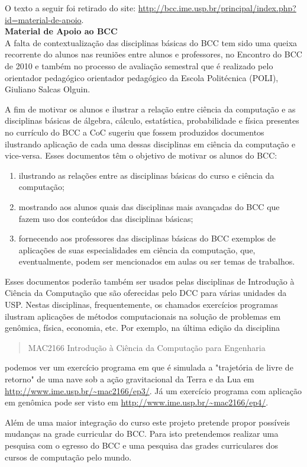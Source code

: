 O texto a seguir foi retirado do site: \url{http://bcc.ime.usp.br/principal/index.php?id=material-de-apoio}. \\

{\large \textbf{Material de Apoio ao BCC}} \\

A falta de contextualização das disciplinas básicas do BCC tem sido uma queixa recorrente do alunos nas reuniões entre alunos e professores, no Encontro do BCC de 2010 e também no processo de avaliação semestral que é realizado pelo orientador pedagógico orientador pedagógico da Escola Politécnica (POLI), Giuliano Salcas Olguin.

A fim de motivar os alunos e ilustrar a relação entre ciência da computação e as disciplinas básicas de álgebra, cálculo, estatística, probabilidade e física presentes no currículo do BCC a CoC sugeriu que fossem produzidos documentos ilustrando aplicação de cada uma dessas disciplinas em ciência da computação e vice-versa.  Esses documentos têm o objetivo de motivar os alunos do BCC:

\begin{enumerate}
\item ilustrando as relações entre as disciplinas básicas do curso e ciência da computação;
\item mostrando aos alunos quais das disciplinas mais avançadas do BCC que fazem uso dos conteúdos das disciplinas básicas;
\item fornecendo aos professores das disciplinas básicas do BCC exemplos de aplicações de suas especialidades em ciência da computação, que, eventualmente, podem ser mencionados em aulas ou ser temas de trabalhos.
\end{enumerate}

Esses documentos poderão também ser usados pelas disciplinas de Introdução à Ciência da Computação que são oferecidas pelo DCC para várias unidades da USP. Nestas disciplinas, frequentemente, os chamados exercícios programas ilustram aplicações de métodos computacionais na solução de problemas em genômica, física, economia, etc.
Por exemplo, na última edição da disciplina \begin{quote} MAC2166 Introdução à Ciência da Computação para Engenharia \end{quote}
podemos ver um exercício programa em que é simulada a "trajetória de livre de retorno" de uma nave sob a ação gravitacional da Terra e da Lua em \url{http://www.ime.usp.br/~mac2166/ep3/}. Já um exercício programa com aplicação em genômica pode ser visto em \url{http://www.ime.usp.br/~mac2166/ep4/}.

Além de uma maior integração do curso este projeto pretende propor possíveis mudanças na grade curricular do BCC. Para isto pretendemos realizar uma pesquisa com o egresso do BCC e uma pesquisa das grades curriculares dos cursos de computação pelo mundo.
